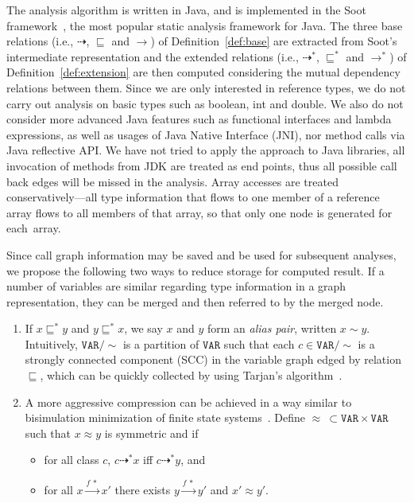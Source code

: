 \documentclass{llncs}
\newcommand\Var{\mathtt{VAR}}
\newcommand{\less}{\sqsubseteq}
\newcommand{\tflow}{\dashrightarrow}
\newcommand{\hflow}{\longrightarrow}
\newcommand{\lhflow}[1]{\stackrel{#1}{\hflow}}
\begin{document}
The analysis algorithm is written in Java, and is implemented in the Soot framework~\cite{soot}, the most popular static analysis framework for Java. The three base relations (i.e., $\tflow$, $\less$ and $\rightarrow$) of Definition~\ref{def:base} are extracted from Soot's intermediate representation and the extended relations (i.e., $\tflow^*$, $\less^*$ and $\rightarrow^*$) of Definition~\ref{def:extension} are then computed considering the mutual dependency relations between them. Since we are only interested in reference types, we do not carry out analysis on basic types such as \textsf{boolean}, \textsf{int} and \textsf{double}. We also do not consider more advanced Java features such as functional interfaces and lambda expressions, as well as usages of Java Native Interface (JNI), nor method calls via Java reflective API. We have not tried to apply the approach to Java libraries, all invocation of methods from JDK are treated as end points, thus all possible call back edges will be missed in the analysis.
%
Array accesses are treated conservatively---all type information that flows to one member of a reference array flows to all members of that array, so that only one node is generated for each~array.

Since call graph information may be saved and be used for subsequent analyses, we propose the following two ways to reduce storage for computed result. If a number of variables are similar regarding type information in a graph representation, they can be merged and then referred to by the merged node.

\begin{enumerate}
  \item If $x\less^*y$ and $y\less^*x$, we say $x$ and $y$ form an \emph{alias pair}, written $x\sim y$. Intuitively, $\Var/\sim$ is a partition of $\Var$ such that each $c\in\Var/\sim$ is a strongly connected component (SCC) in the variable graph edged by relation $\less$, which can be quickly collected by using Tarjan's algorithm~\cite{Tarjan72}.
  \item A more aggressive compression can be achieved in a way similar to bisimulation minimization of finite state systems~\cite{Kanellakis90,Paige87}. Define $\approx\ \subset\Var\times\Var$ such that $x\approx y$ is symmetric and if
      \begin{itemize}
      \item for all class $c$, $c\tflow^* x$ iff $c\tflow^*y$, and
      \item for all $x\lhflow{f\ *}x'$ there exists $y\lhflow{f\ *}y'$ and $x'\approx y'$.
      \end{itemize}
\end{enumerate}
\end{document}
